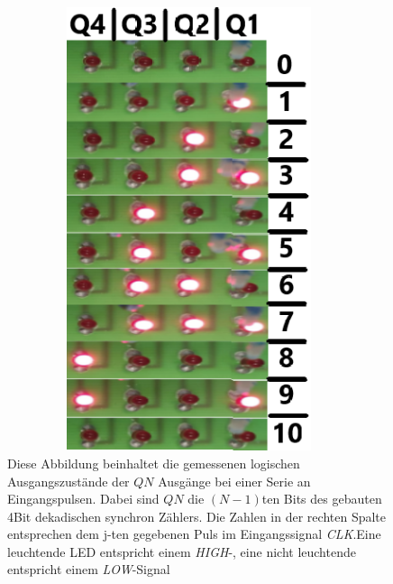 \documentclass[12pt,english,ngerman]{scrartcl}
\begin{document}
\begin{figure}[H]
  \centering
    \includegraphics[width=0.95\textwidth,height=13cm]{./figures/messungen/4bit/wahrheit.png}
  \caption{Diese Abbildung beinhaltet die gemessenen logischen Ausgangszustände
    der $QN$ Ausgänge bei einer Serie an Eingangspulsen. Dabei sind $QN$ die
    $(N-1)$ten Bits des gebauten 4Bit dekadischen synchron Zählers. Die Zahlen
    in der rechten Spalte entsprechen dem j-ten gegebenen Puls im
  Eingangssignal \textit{CLK}.Eine leuchtende LED entspricht einem
\textit{HIGH}-, eine nicht leuchtende entspricht einem \textit{LOW}-Signal}
  \label{fig:mess_wahrheitstabelle_alarm}
\end{figure}

\end{document}
